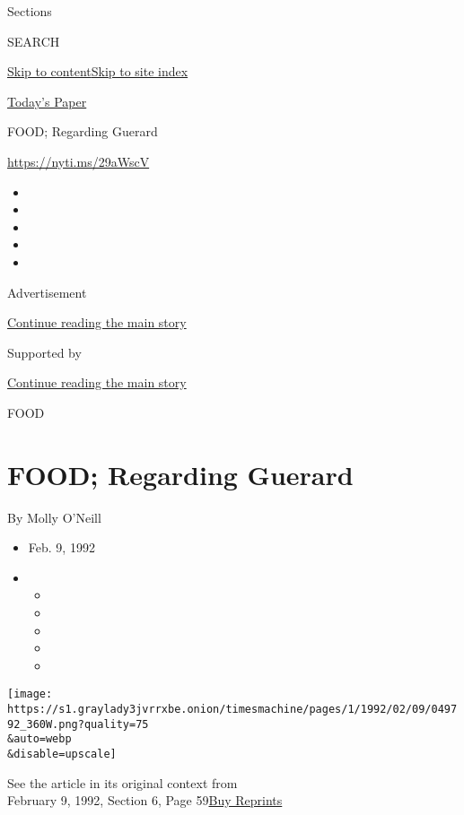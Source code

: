 Sections

SEARCH

\protect\hyperlink{site-content}{Skip to
content}\protect\hyperlink{site-index}{Skip to site index}

\href{https://myaccount.nytimes3xbfgragh.onion/auth/login?response_type=cookie\&client_id=vi}{}

\href{https://www.nytimes3xbfgragh.onion/section/todayspaper}{Today's
Paper}

FOOD; Regarding Guerard

\url{https://nyti.ms/29aWscV}

\begin{itemize}
\item
\item
\item
\item
\item
\end{itemize}

Advertisement

\protect\hyperlink{after-top}{Continue reading the main story}

Supported by

\protect\hyperlink{after-sponsor}{Continue reading the main story}

FOOD

\hypertarget{food-regarding-guerard}{%
\section{FOOD; Regarding Guerard}\label{food-regarding-guerard}}

By Molly O'Neill

\begin{itemize}
\item
  Feb. 9, 1992
\item
  \begin{itemize}
  \item
  \item
  \item
  \item
  \item
  \end{itemize}
\end{itemize}

\texttt{[image: https://s1.graylady3jvrrxbe.onion/timesmachine/pages/1/1992/02/09/049792\_360W.png?quality=75\\\&auto=webp\\\&disable=upscale]}

See the article in its original context from\\
February 9, 1992, Section 6, Page
59\href{https://store.nytimes3xbfgragh.onion/collections/new-york-times-page-reprints?utm_source=nytimes\&utm_medium=article-page\&utm_campaign=reprints}{Buy
Reprints}

